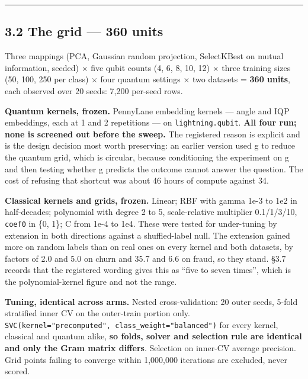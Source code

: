 \documentclass[
  10pt,
]{article}
\newcounter{none} %
\begin{document}
\begin{center}\rule{0.5\linewidth}{0.5pt}\end{center}

\subsection{3.2 The grid --- 360 units}\label{the-grid-360-units}

Three mappings (PCA, Gaussian random projection, SelectKBest on mutual
information, seeded) \(\times\) five qubit counts (4, 6, 8, 10, 12)
\(\times\) three training sizes (50, 100, 250 per class) \(\times\) four
quantum settings \(\times\) two datasets = \textbf{360 units}, each
observed over 20 seeds: 7,200 per-seed rows.

\textbf{Quantum kernels, frozen.} PennyLane embedding kernels --- angle
and IQP embeddings, each at 1 and 2 repetitions --- on
\texttt{lightning.qubit}. \textbf{All four run; none is screened out
before the sweep.} The registered reason is explicit and is the design
decision most worth preserving: an earlier version used g to reduce the
quantum grid, which is circular, because conditioning the experiment on
g and then testing whether g predicts the outcome cannot answer the
question. The cost of refusing that shortcut was about 46 hours of
compute against 34.

\textbf{Classical kernels and grids, frozen.} Linear; RBF with gamma
1e-3 to 1e2 in half-decades; polynomial with degree 2 to 5,
scale-relative multiplier 0.1/1/3/10, \texttt{coef0} in \{0, 1\}; C from
1e-4 to 1e4. These were tested for under-tuning by extension in both
directions against a shuffled-label null. The extension gained more on
random labels than on real ones on every kernel and both datasets, by
factors of 2.0 and 5.0 on churn and 35.7 and 6.6 on fraud, so they
stand. \S{}3.7 records that the registered wording gives this as ``five
to seven times'', which is the polynomial-kernel figure and not the
range.

\textbf{Tuning, identical across arms.} Nested cross-validation: 20
outer seeds, 5-fold stratified inner CV on the outer-train portion only.
\texttt{SVC(kernel="precomputed",\ class\_\allowbreak{}weight="balanced")} for every
kernel, classical and quantum alike, \textbf{so folds, solver and
selection rule are identical and only the Gram matrix differs}.
Selection on inner-CV average precision. Grid points failing to converge
within 1,000,000 iterations are excluded, never scored.
\end{document}
